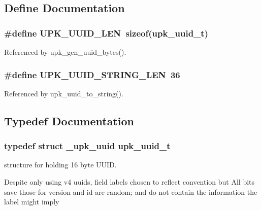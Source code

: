 \subsection{Define Documentation}
\subsubsection[{UPK\_\-UUID\_\-LEN}]{\setlength{\rightskip}{0pt plus 5cm}\#define UPK\_\-UUID\_\-LEN~sizeof({\bf upk\_\-uuid\_\-t})}\label{group__uuid_ga5c492b948c7c6a74289b75ef6dee5f8b}


Referenced by upk\_\-gen\_\-uuid\_\-bytes().

\subsubsection[{UPK\_\-UUID\_\-STRING\_\-LEN}]{\setlength{\rightskip}{0pt plus 5cm}\#define UPK\_\-UUID\_\-STRING\_\-LEN~36}\label{group__uuid_ga4e7d198c8257d81f92ec7d4c1d6e7cb5}


Referenced by upk\_\-uuid\_\-to\_\-string().



\subsection{Typedef Documentation}
\subsubsection[{upk\_\-uuid\_\-t}]{\setlength{\rightskip}{0pt plus 5cm}typedef struct {\bf \_\-upk\_\-uuid}  {\bf upk\_\-uuid\_\-t}}\label{group__uuid_gad592133cddb5acf4c36149653d128496}


structure for holding 16 byte UUID. 

Despite only using v4 uuids, field labels chosen to reflect convention but All bits save those for version and id are random; and do not contain the information the label might imply 